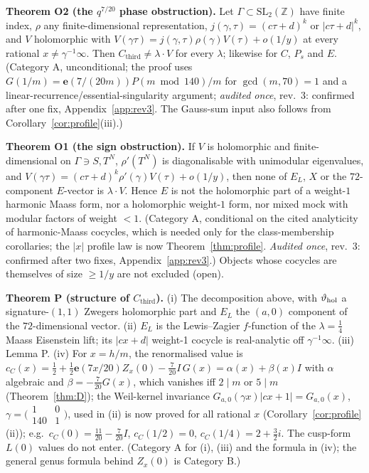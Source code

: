 \documentclass[11pt]{article}
\theoremstyle{definition}
\newcommand{\Z}{\mathbb{Z}}
\newcommand{\e}{\mathbf{e}}
\newcommand{\Cthird}{C_{\mathrm{third}}}
\begin{document}
\noindent\textbf{Theorem O2 (the $q^{7/20}$ phase obstruction).} Let $\Gamma\subset\mathrm{SL}_2(\Z)$ have finite index, $\rho$ any
finite-dimensional representation, $j(\gamma,\tau)=(c\tau+d)^k$ or $|c\tau+d|^k$, and $V$ holomorphic with
$V(\gamma\tau)=j(\gamma,\tau)\rho(\gamma)V(\tau)+o(1/y)$ at every rational $x\neq\gamma^{-1}\infty$. Then $\Cthird\neq\lambda\cdot V$ for every
$\lambda$; likewise for $C$, $P_s$ and $E$. (Category A, unconditional; the proof uses $G(1/m)=\e(7/(20m))P(m\bmod140)/m$ for $\gcd(m,70)=1$ and
a linear-recurrence/essential-singularity argument; \emph{audited once}, rev.~3: confirmed after one fix, Appendix~\ref{app:rev3}. The Gauss-sum input
also follows from Corollary~\ref{cor:profile}(iii).)

\noindent\textbf{Theorem O1 (the sign obstruction).} If $V$ is holomorphic and finite-dimensional on $\Gamma\ni S,T^N$, $\rho'(T^N)$ is
diagonalisable with unimodular eigenvalues, and $V(\gamma\tau)=(c\tau+d)^k\rho'(\gamma)V(\tau)+o(1/y)$, then none of $E_L$, $X$ or the
$72$-component $E$-vector is $\lambda\cdot V$. Hence $E$ is not the holomorphic part of a weight-$1$ harmonic Maass form, nor a holomorphic
weight-$1$ form, nor mixed mock with modular factors of weight $<1$. (Category A, conditional on the cited analyticity of harmonic-Maass
cocycles, which is needed only for the class-membership corollaries; the $|x|$ profile law is now Theorem~\ref{thm:profile}. \emph{Audited once}, rev.~3:
confirmed after two fixes, Appendix~\ref{app:rev3}.) Objects whose cocycles are themselves of size $\ge1/y$ are not
excluded (open).

\noindent\textbf{Theorem P (structure of $\Cthird$).} (i) The decomposition above, with $\vartheta_{\rm hol}$ a signature-$(1,1)$ Zwegers
holomorphic part and $E_L$ the $(a,0)$ component of the $72$-dimensional vector. (ii) $E_L$ is the Lewis--Zagier $f$-function of the
$\lambda=\tfrac14$ Maass Eisenstein lift; its $|cx+d|$ weight-1 cocycle is real-analytic off $\gamma^{-1}\infty$. (iii) Lemma P.
(iv) For $x=h/m$, the renormalised value is $c_C(x)=\tfrac12+\tfrac12\e(7x/20)Z_x(0)-\tfrac7{20}I\,G(x)=\alpha(x)+\beta(x)I$ with $\alpha$
algebraic and $\beta=-\tfrac7{20}G(x)$, which vanishes iff $2\mid m$ or $5\mid m$ (Theorem~\ref{thm:D}); the Weil-kernel invariance $G_{a,0}(\gamma x)|cx+1|=G_{a,0}(x)$,
$\gamma=\bigl(\begin{smallmatrix}1&0\\140&1\end{smallmatrix}\bigr)$, used in (ii) is now proved for all rational $x$ (Corollary~\ref{cor:profile}(ii)); e.g.\ $c_C(0)=\tfrac{11}{20}-\tfrac7{20}I$, $c_C(1/2)=0$,
$c_C(1/4)=2+\tfrac32i$. The cusp-form $L(0)$ values do not enter. (Category A for (i), (iii) and the formula in (iv); the general genus formula
behind $Z_x(0)$ is Category B.)
\end{document}

